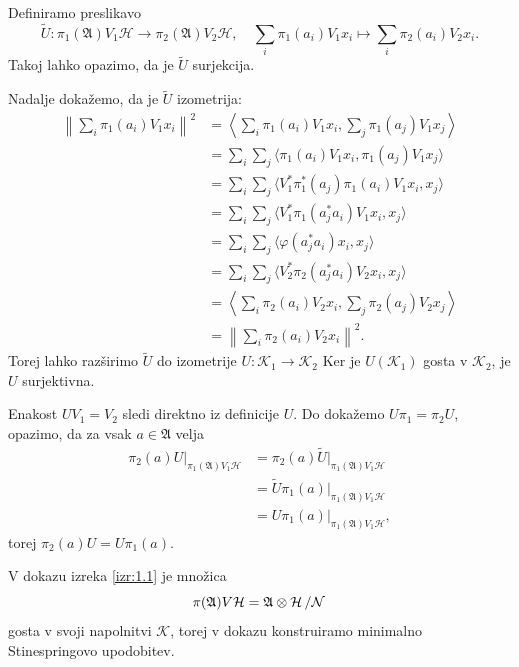 \begin{dokaz}
    Definiramo preslikavo
    $$\widetilde{U} : \pi_1 (\mathfrak{A}) V_1 \mathcal{H} \to \pi_2 (\mathfrak{A}) V_2 \mathcal{H},\quad \sum_i \pi_1 (a_i) V_1 x_i \mapsto \sum_i \pi_2 (a_i) V_2 x_i.$$
    Takoj lahko opazimo, da je $\widetilde{U}$ surjekcija.

    Nadalje dokažemo, da je $\widetilde{U}$ izometrija:
    \begin{align*}
        \left\| \sum_i \pi_1 (a_i) V_1 x_i \right\|^2 &= \left\langle \sum_i \pi_1 (a_i) V_1 x_i, \sum_j \pi_1 (a_j) V_1 x_j \right\rangle\\
        &= \sum_i \sum_j \langle \pi_1 (a_i) V_1 x_i, \pi_1 (a_j) V_1 x_j\rangle\\
        &= \sum_i \sum_j \langle V_1^* \pi_1 ^* (a_j) \pi_1 (a_i) V_1 x_i,  x_j\rangle\\
        &= \sum_i \sum_j \langle V_1^* \pi_1 (a_j^* a_i) V_1 x_i,  x_j\rangle\\
        &= \sum_i \sum_j \langle \varphi(a_j^* a_i) x_i,  x_j\rangle\\
        &= \sum_i \sum_j \langle V_2^* \pi_2 (a_j^* a_i) V_2 x_i,  x_j\rangle\\
        &= \left\langle \sum_i \pi_2 (a_i) V_2 x_i, \sum_j \pi_2 (a_j) V_2 x_j \right\rangle\\
        &= \left\| \sum_i \pi_2 (a_i) V_2 x_i \right\|^2.
    \end{align*}
    Torej lahko razširimo $\widetilde{U}$ do izometrije $U: \mathcal{K}_1 \to \mathcal{K_2}$
    Ker je $U(\mathcal{K}_1)$ gosta v $\mathcal{K}_2$, je $U$ surjektivna.

    Enakost $U V_1 = V_2$ sledi direktno iz definicije $U$.
    Do dokažemo $U \pi_1 = \pi_2 U$, opazimo, da za vsak $a \in \mathfrak{A}$ velja 
    \begin{align*}
        \pi_2 (a) U \big|_{\pi_1 (\mathfrak{A}) V_1 \mathcal{H}}
        &=  \pi_2 (a) \widetilde{U} \big|_{\pi_1 (\mathfrak{A}) V_1 \mathcal{H}}\\
        &= \widetilde{U} \pi_1 (a) \big|_{\pi_1 (\mathfrak{A}) V_1 \mathcal{H}}\\
        &= U \pi_1 (a) \big|_{\pi_1 (\mathfrak{A}) V_1 \mathcal{H}},
    \end{align*}
    torej $\pi_2 (a) U = U \pi_1 (a)$. 
\end{dokaz}

\begin{opomba}
    V dokazu izreka \ref{izr:1.1} je množica
    $$\pi(\mathfrak{A}) V \mathcal{H} = \quot{\mathfrak{A} \otimes \mathcal{H}}{\mathcal{N}}$$
    gosta v svoji napolnitvi $\mathcal{K}$, torej v dokazu konstruiramo minimalno Stinespringovo upodobitev.
\end{opomba}


